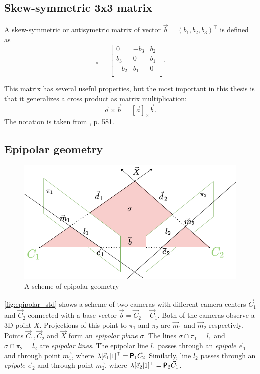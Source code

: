 \subsection{Skew-symmetric 3x3 matrix}
A skew-symmetric or antisymetric matrix of vector $\vec{b} = (b_1, b_2, b_3)^\top$ is defined as
\begin{equation}
    [\vec{b}]_{\times} = \begin{bmatrix}
        0 & -b_3 & b_2 \\ 
        b_3 & 0 & b_1 \\ 
        -b_2 & b_1 & 0 \\ 
    \end{bmatrix}.
\end{equation}

This matrix has several useful properties, but the most important in this thesis is that it generalizes a cross product as matrix multiplication:
\begin{equation}
    \vec{a} \times \vec{b} = [\vec{a}]_{\times} \vec{b}.
\end{equation}
The notation is taken from \cite{hartley_zisserman_2004}, p. 581.
\subsection{Epipolar geometry}
\label{sec:epipolar_geometry}
\begin{figure}[h]
    \centering
    \includegraphics[width=\textwidth]{graphics/epipolar.png}
    \caption{A scheme of epipolar geometry}
    \label{fig:epipolar_std}
\end{figure}

\autoref{fig:epipolar_std} shows a scheme of two cameras with different camera centers $\vec{C}_1$ and $\vec{C}_2$ connected with a base vector $\vec{b} = \vec{C}_2 - \vec{C}_1$. 
Both of the cameras observe a 3D point $X$. 
Projections of this point to $\pi_1$ and $\pi_2$ are $\vec{m}_1$ and $\vec{m}_2$ respectivly. 
Points $\vec{C}_1, \vec{C}_2$ and $\vec{X}$ form an \textit{epipolar plane} $\sigma$.
The lines $\sigma \cap \pi_1 = l_1$ and $\sigma \cap \pi_2 = l_2$ are \textit{epipolar lines}. 
The epipolar line $l_1$ passes through an \textit{epipole} $\vec{e}_1$ and through point $\vec{m_1}$, where $\lambda [\vec{e}_1 | 1]^\top = \pmb{\mathsf{P}}_1 \vec{C}_2$
Similarly, line $l_2$ passes through an \textit{epipole} $\vec{e}_2$ and through point $\vec{m_2}$, where $\lambda [\vec{e}_2 | 1]^\top = \pmb{\mathsf{P}}_2 \vec{C}_1$.

